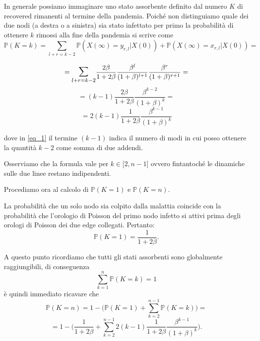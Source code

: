        In generale possiamo immaginare uno stato assorbente definito dal numero $K$ di recovered rimanenti al termine della pandemia. Poiché non distinguiamo quale dei due nodi (a destra o a sinistra) sia stato infettato per primo la probabilità di ottenere $k$ rimossi alla fine della pandemia si scrive come
        \[
	\mathbb{P}(K=k)=\sum_{l+r=k-2} \mathbb{P}(X(\infty)=y_{r,l} | X(0))  +\mathbb{P}(X(\infty)=x_{r,l} | X(0))=
        \]

                \[
	=\mathlarger{\mathlarger{\sum}}_{l+r=k-2}\frac{2\beta}{1+2\beta}\frac{\beta^l}{(1+\beta)^{l+1}}\frac{\beta^r}{(1+\beta)^{r+1}} =
        \]
          \[
	=(k-1)\frac{2\beta}{1+2\beta}\frac{\beta^{k-2}}{(1+\beta)^k}=
        \]
         \begin{equation}\label{eq_1}
	=2(k-1)\frac{1}{1+2\beta}\frac{\beta^{k-1}}{(1+\beta)^k}
	\end{equation}
       

dove in \eqref{eq_1} il termine $(k-1)$ indica il numero di modi in cui posso ottenere la quantità $k-2$ come somma di due addendi.

Osserviamo che la formula vale per $k \in \lbrack 2,n-1 \rbrack $ ovvero fintantoché le dinamiche sulle due linee restano indipendenti. 

Procediamo ora al calcolo di $\mathbb{P}(K=1)$ e $\mathbb{P}(K=n)$.

La probabilità che un solo nodo sia colpito dalla malattia coincide con la probabilità che l'orologio di Poisson del primo nodo infetto si attivi prima degli orologi di Poisson dei due edge collegati.
Pertanto:
  \[
		\mathbb{P}(K=1)=\frac{1}{1+2\beta}.
		      \]

       
  A questo punto ricordiamo che tutti gli stati assorbenti sono globalmente raggiungibili, di conseguenza
       \[
		\sum_{k=1}^{n} \mathbb{P}(K=k) =1
        \]
	è quindi immediato ricavare che
          \[
		\mathbb{P}(K=n)=1-\bigg(\mathbb{P}(K=1)+\sum_{k=2}^{n-1}\mathbb{P}(K=k) \bigg) =
        \]
         \[
		=1-\bigg(\frac{1}{1+2\beta}+\sum_{k=2}^{n-1}2(k-1)\frac{1}{1+2\beta}\frac{\beta^{k-1}}{(1+\beta)^k} \bigg).
        \]


	  






